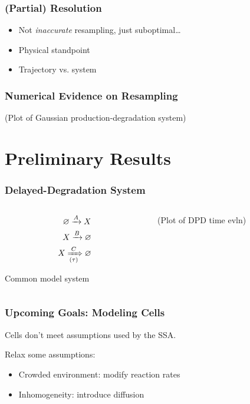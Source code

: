 \documentclass[xcolor={usenames,dvipsnames,svgnames}]{beamer}
\begin{document}
\begin{frame}
    \frametitle{(Partial) Resolution}
    \begin{itemize}
        \item Not \emph{inaccurate} resampling, just suboptimal\ldots
        \item Physical standpoint
        \item Trajectory vs. system
    \end{itemize}
\end{frame}

\begin{frame}
    \frametitle{Numerical Evidence on Resampling}
    (Plot of Gaussian production-degradation system)
\end{frame}


\section{Preliminary Results}

\begin{frame}
    \frametitle{Delayed-Degradation System}
    \begin{columns}[c]
        \begin{column}{0.5\textwidth}
            \begin{align*}
                \varnothing \xrightarrow{A} X \\
                X \xrightarrow{B} \varnothing \\
                X \xRightarrow[(\tau)]{C} \varnothing
            \end{align*}

            Common model system
        \end{column}
        \begin{column}{0.5\textwidth}
            (Plot of DPD time evln)
        \end{column}
    \end{columns}
\end{frame}


\begin{frame}
    \frametitle{Upcoming Goals: Modeling Cells}
    Cells don't meet assumptions used by the SSA.

    Relax some assumptions:
    \begin{itemize}
        \item Crowded environment: modify reaction rates
        \item Inhomogeneity: introduce diffusion
    \end{itemize}
\end{frame}
\end{document}
